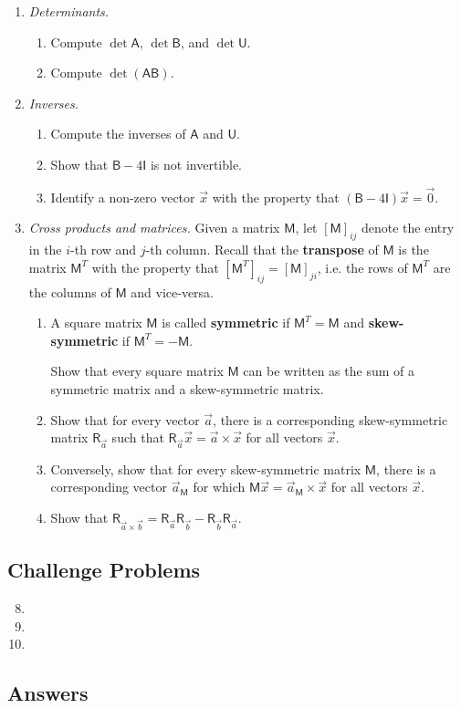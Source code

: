 \begin{enumerate}
\begin{enumerate}
\end{enumerate}
\newpage
\item \emph{Determinants.}
\begin{enumerate}
\item Compute $\det\mathsf{A}$, $\det\mathsf{B}$, and $\det\mathsf{U}$.
\item Compute $\det(\mathsf{AB})$.
\end{enumerate}
\item \emph{Inverses.}
\begin{enumerate}
\item Compute the inverses of $\mathsf{A}$ and $\mathsf{U}$.
\item Show that $\mathsf{B} - 4\mathsf{I}$ is not invertible.
\item Identify a non-zero vector $\vec{x}$ with the property that $(\mathsf{B} - 4\mathsf{I})\vec{x} = \vec{0}$.
\end{enumerate}
\item \emph{Cross products and matrices.} Given a matrix $\mathsf{M}$, let $[\mathsf{M}]_{ij}$ denote the entry in the $i$-th row and $j$-th column. Recall that the \textbf{transpose} of $\mathsf{M}$ is the matrix $\mathsf{M}^T$ with the property that $[\mathsf{M}^T]_{ij} = [\mathsf{M}]_{ji}$, i.e. the rows of $\mathsf{M}^T$ are the columns of $\mathsf{M}$ and vice-versa.
\begin{enumerate}
\item A square matrix $\mathsf{M}$ is called \textbf{symmetric} if $\mathsf{M}^T = \mathsf{M}$ and \textbf{skew-symmetric} if $\mathsf{M}^T = -\mathsf{M}$.\par
Show that every square matrix $\mathsf{M}$ can be written as the sum of a symmetric matrix and a skew-symmetric matrix.
\item Show that for every vector $\vec{a}$, there is a corresponding skew-symmetric matrix $\mathsf{R}_{\vec{a}}$ such that $\mathsf{R}_{\vec{a}}\vec{x} = \vec{a}\times\vec{x}$ for all vectors $\vec{x}$.
\item Conversely, show that for every skew-symmetric matrix $\mathsf{M}$, there is a corresponding vector $\vec{a}_{\mathsf{M}}$ for which $\mathsf{M}\vec{x} = \vec{a}_{\mathsf{M}}\times\vec{x}$ for all vectors $\vec{x}$.
\item Show that $\mathsf{R}_{\vec{a}\times\vec{b}} = \mathsf{R}_{\vec{a}}\mathsf{R}_{\vec{b}} - \mathsf{R}_{\vec{b}}\mathsf{R}_{\vec{a}}$.
\end{enumerate}
\end{enumerate}


\newpage
\subsection{Challenge Problems}

\begin{enumerate}\setcounter{enumi}{7}
\item %
\item %
\item %
\end{enumerate}


\newpage
\subsection{Answers}